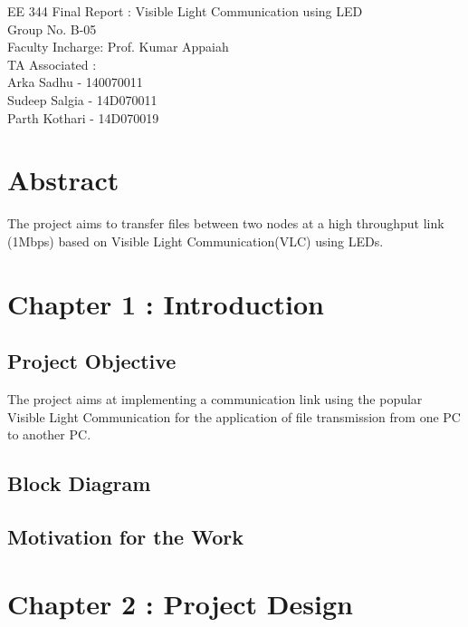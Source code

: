 \documentclass{article}
\begin{document}

EE 344 Final Report : Visible Light Communication using LED\\
Group No. B-05\\
Faculty Incharge: Prof. Kumar Appaiah\\
TA Associated : \\
Arka Sadhu - 140070011\\
Sudeep Salgia - 14D070011\\
Parth Kothari - 14D070019\\

\section{Abstract}

The project aims to transfer files between two nodes at a high throughput link (1Mbps) based on Visible Light Communication(VLC) using LEDs. 
\tableofcontents

\section{Chapter 1 : Introduction}
\subsection{Project Objective}
The project aims at implementing a communication link using the popular Visible Light Communication for the application of file transmission from one PC to another PC. 
\subsection{Block Diagram}

\subsection{Motivation for the Work}

\section{Chapter 2 : Project Design}
\end{document}
